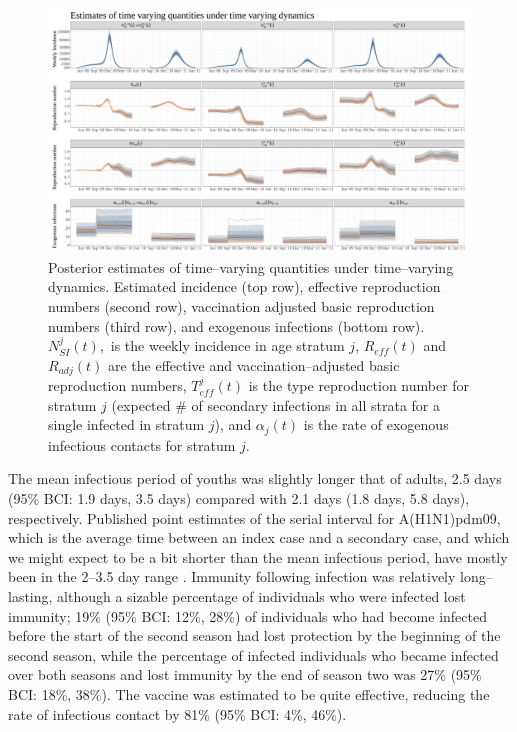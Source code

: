 \begin{figure}
	\centering
	\includegraphics[width=0.95\linewidth]{figures/flu_rw_ode_timevarying_plots}
	\caption[Estimated A(H1N1) incidence, reproduction numbers, and rates of exogenous infection under time--varying dynamics.]{Posterior estimates of time--varying quantities under time--varying dynamics. Estimated incidence (top row), effective reproduction numbers (second row), vaccination adjusted basic reproduction numbers (third row), and exogenous infections (bottom row). $ N_{SI}^j(t), $ is the weekly incidence in age stratum $ j $, $ R_{eff}(t) $ and $ R_{adj}(t) $ are the effective and vaccination--adjusted basic reproduction numbers, $ T_{eff}^j(t) $ is the type reproduction number for stratum $ j $ (expected \# of secondary infections in all strata for a single infected in stratum $ j $), and $ \alpha_j(t) $ is the rate of exogenous infectious contacts for stratum $ j $.}
	\label{fig:flurwodetimevaryingplots}
\end{figure}

The mean infectious period of youths was slightly longer that of adults, 2.5 days (95\% BCI: 1.9 days, 3.5 days) compared with 2.1 days (1.8 days, 5.8 days), respectively. Published point estimates of the serial interval for A(H1N1)pdm09, which is the average time between an index case and a secondary case, and which we might expect to be a bit shorter than the mean infectious period, have mostly been in the 2--3.5 day range \cite{vink2014serial}. Immunity following infection was relatively long--lasting, although a sizable percentage of individuals who were infected lost immunity; 19\% (95\% BCI: 12\%, 28\%) of individuals who had become infected before the start of the second season had lost protection by the beginning of the second season, while the percentage of infected individuals who became infected over both seasons and lost immunity by the end of season two was 27\% (95\% BCI: 18\%, 38\%). The vaccine was estimated to be quite effective,  reducing the rate of infectious contact by 81\% (95\% BCI: 4\%, 46\%). 

